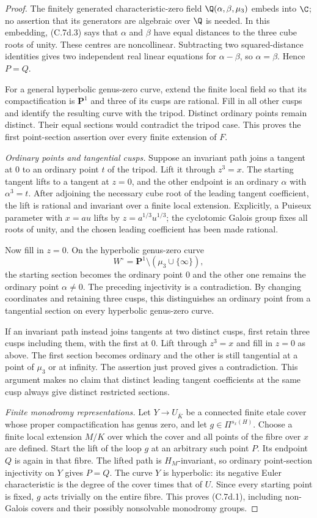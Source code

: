 \begin{proof}
The finitely generated characteristic-zero field
$\Q(\alpha,\beta,\mu_3)$ embeds into $\C$; no assertion that its
generators are algebraic over $\Q$ is needed. In this embedding,
(C.7d.3) says that $\alpha$ and $\beta$ have equal distances to the
three cube roots of unity. These centres are noncollinear. Subtracting
two squared-distance identities gives two independent real linear
equations for $\alpha-\beta$, so $\alpha=\beta$. Hence $P=Q$.

For a general hyperbolic genus-zero curve, extend the finite local
field so that its compactification is $\mathbf P^1$ and three of its
cusps are rational. Fill in all other cusps and identify the resulting
curve with the tripod. Distinct ordinary points remain distinct.
Their equal sections would contradict the tripod case. This proves
the first point-section assertion over every finite extension of $F$.

\emph{Ordinary points and tangential cusps.}
Suppose an invariant path joins a tangent at $0$ to an ordinary
point $t$ of the tripod. Lift it through $z^3=x$. The starting
tangent lifts to a tangent at $z=0$, and the other endpoint is an
ordinary $\alpha$ with $\alpha^3=t$. After adjoining the necessary
cube root of the leading tangent coefficient, the lift is rational
and invariant over a finite local extension. Explicitly, a Puiseux
parameter with $x=a u$ lifts by $z=a^{1/3}u^{1/3}$; the cyclotomic
Galois group fixes all roots of unity, and the chosen leading
coefficient has been made rational.

Now fill in $z=0$. On the hyperbolic genus-zero curve
\[
          W^\circ=\mathbf P^1\setminus(\mu_3\cup\{\infty\}),
\]
the starting section becomes the ordinary point $0$ and the other
one remains the ordinary point $\alpha\ne0$. The preceding
injectivity is a contradiction. By changing coordinates and
retaining three cusps, this distinguishes an ordinary point from a
tangential section on every hyperbolic genus-zero curve.

If an invariant path instead joins tangents at two distinct cusps,
first retain three cusps including them, with the first at $0$.
Lift through $z^3=x$ and fill in $z=0$ as above. The first section
becomes ordinary and the other is still tangential at a point of
$\mu_3$ or at infinity. The assertion just proved gives a contradiction.
This argument makes no claim that distinct leading tangent
coefficients at the same cusp always give distinct restricted sections.

\emph{Finite monodromy representations.}
Let $Y\to U_{\bar K}$ be a connected finite etale cover whose proper
compactification has genus zero, and let $g\in\Pi^{s_x(H)}$.
Choose a finite local extension $M/K$ over which the cover and all
points of the fibre over $x$ are defined. Start the lift of the loop
$g$ at an arbitrary such point $P$. Its endpoint $Q$ is again in
that fibre. The lifted path is $H_M$-invariant, so ordinary
point-section injectivity on $Y$ gives $P=Q$. The curve $Y$ is
hyperbolic: its negative Euler characteristic is the degree of the
cover times that of $U$. Since every starting point is fixed,
$g$ acts trivially on the entire fibre. This proves (C.7d.1), including
non-Galois covers and their possibly nonsolvable monodromy groups.


\end{proof}

